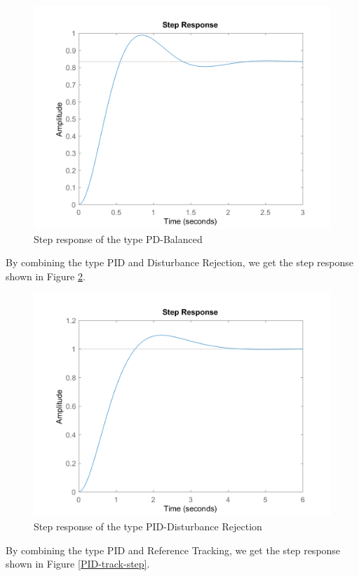 \documentclass[a4paper, twocolumn, titlepage, 10pt]{article}
\begin{document}
\begin{figure}[H]
	\centering
	\includegraphics[width=\linewidth]{PD-balance-step}
	\caption{Step response of the type PD-Balanced}
	\label{PD-balance-step}
\end{figure}
						   	By combining the type PID and Disturbance Rejection, we get the step response shown in Figure \ref{PID-rej-step}.
\begin{figure}[H]
	\centering
	\includegraphics[width=\linewidth]{PID-rej-step}
	\caption{Step response of the type PID-Disturbance Rejection}
	\label{PID-rej-step}
\end{figure}
						   	By combining the type PID and Reference Tracking, we get the step response shown in Figure \ref{PID-track-step}.
\end{document}
